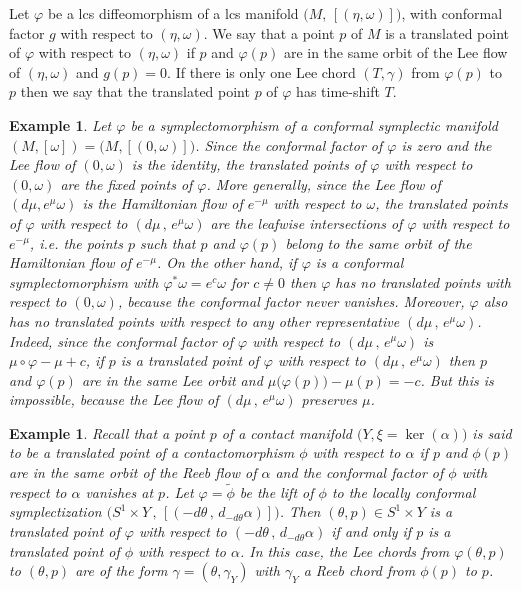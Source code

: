 \documentclass{amsart}
\newtheorem{example}[thm]{Example}
\theoremstyle{remark}
\begin{document}
Let $\varphi$ be a lcs diffeomorphism
of a lcs manifold $\big(M, \, [(\eta, \omega)]\big)$,
with conformal factor $g$ with respect to $(\eta, \omega)$.
We say that a point $p$ of $M$
is a translated point of $\varphi$
with respect to $(\eta, \omega)$
if $p$ and $\varphi(p)$ are in the same orbit
of the Lee flow of $(\eta, \omega)$
and $g(p) = 0$.
If there is only one Lee chord $(T, \gamma)$
from $\varphi(p)$ to $p$
then we say that the translated point $p$ of $\varphi$
has time-shift $T$.

\begin{example}\label{example: translated points symplectic}
Let $\varphi$ be a symplectomorphism
of a conformal symplectic manifold $(M, [\omega]) = \big(M, [(0, \omega)]\big)$. 
Since the conformal factor of $\varphi$ is zero
and the Lee flow of $(0, \omega)$ is the identity,
the translated points of $\varphi$ with respect to $(0, \omega)$
are the fixed points of $\varphi$.
More generally,
since the Lee flow of $(d\mu, e^{\mu} \omega)$
is the Hamiltonian flow of $e^{-\mu}$ with respect to $\omega$,
the translated points of $\varphi$
with respect to $(d\mu \,,\, e^{\mu}\omega)$
are the leafwise intersections of $\varphi$
with respect to $e^{-\mu}$,
i.e. the points $p$ such that $p$ and $\varphi(p)$
belong to the same orbit
of the Hamiltonian flow of $e^{-\mu}$. %
On the other hand,
if $\varphi$ is a conformal symplectomorphism
with $\varphi^{\ast} \omega = e^c \omega$
for $c \neq 0$
then $\varphi$ has no translated points
with respect to $(0, \omega)$,
because the conformal factor never vanishes.
Moreover,
$\varphi$ also has no translated points
with respect to any other representative
$(d\mu \,,\, e^{\mu}\omega)$.
Indeed,
since the conformal factor of $\varphi$
with respect to $(d\mu \,,\, e^{\mu}\omega)$
is $\mu \circ \varphi - \mu + c$,
if $p$ is a translated point of $\varphi$
with respect to $(d\mu \,,\, e^{\mu}\omega)$
then $p$ and $\varphi(p)$ are in the same Lee orbit
and $\mu \big(\varphi(p)\big) - \mu (p) = -c$.
But this is impossible,
because the Lee flow of $(d\mu \,,\, e^{\mu}\omega)$
preserves $\mu$.
\end{example}

\begin{example}\label{example: translated points contact}
Recall that a point $p$
of a contact manifold $\big(Y , \xi = \ker (\alpha)\big)$
is said to be a translated point of a contactomorphism $\phi$ with respect to $\alpha$
if $p$ and $\phi(p)$ are in the same orbit
of the Reeb flow of $\alpha$
and the conformal factor of $\phi$ with respect to $\alpha$
vanishes at $p$.
Let $\varphi = \widetilde{\phi}$ be the lift of $\phi$
to the locally conformal symplectization
$\big( S^1 \times Y \,,\, [( -d\theta \,,\, d_{-d\theta}\alpha )] \big)$.
Then $(\theta, p) \in S^1 \times Y$
is a translated point of ${\varphi}$
with respect to $( -d\theta \,,\, d_{-d\theta}\alpha )$
if and only if $p$ is a translated point
of $\phi$ with respect to $\alpha$.
In this case,
the Lee chords from ${\varphi} (\theta, p)$ to $(\theta, p)$
are of the form $\gamma = (\theta, \gamma_Y)$
with $\gamma_Y$ a Reeb chord from $\phi (p)$ to $p$.
\end{example}
\end{document}
